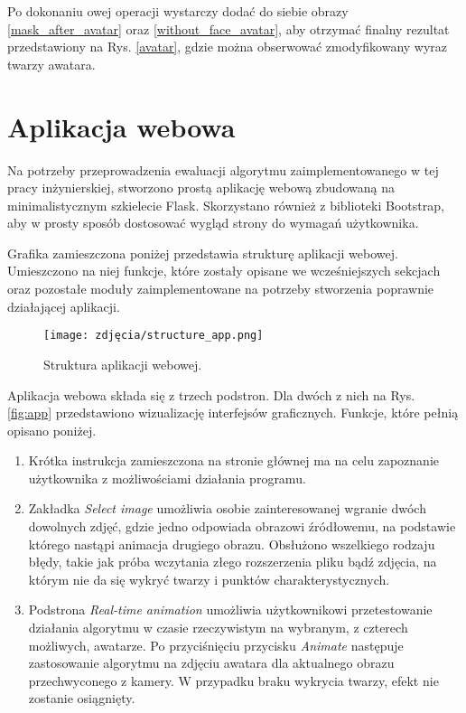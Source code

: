 Po dokonaniu owej operacji wystarczy dodać do siebie obrazy \ref{mask_after_avatar} oraz \ref{without_face_avatar}, aby otrzymać finalny rezultat przedstawiony na Rys. \ref{avatar}, gdzie można obserwować zmodyfikowany wyraz twarzy awatara.



\section{Aplikacja webowa}
Na potrzeby przeprowadzenia ewaluacji algorytmu zaimplementowanego w tej pracy inżynierskiej, stworzono prostą aplikację webową zbudowaną na minimalistycznym szkielecie Flask. Skorzystano również z biblioteki Bootstrap, aby w prosty sposób dostosować wygląd strony do wymagań użytkownika.

Grafika zamieszczona poniżej przedstawia strukturę aplikacji webowej. Umieszczono na niej funkcje, które zostały opisane we wcześniejszych sekcjach oraz pozostałe moduły zaimplementowane na potrzeby stworzenia poprawnie działającej aplikacji.

\begin{figure}[h]
	\centering
	\texttt{[image: zdjęcia/structure\_app.png]}
	\caption{Struktura aplikacji webowej.} 
	\label{fig:structureApp}
\end{figure}

Aplikacja webowa składa się z trzech podstron. Dla dwóch z nich na Rys. \ref{fig:app} przedstawiono wizualizację interfejsów graficznych. Funkcje, które pełnią opisano poniżej.

\begin{enumerate}
    \item Krótka instrukcja zamieszczona na stronie głównej ma na celu zapoznanie użytkownika z możliwościami działania programu.
    \item Zakładka \textit{Select image} umożliwia osobie zainteresowanej wgranie dwóch dowolnych zdjęć, gdzie jedno odpowiada obrazowi źródłowemu, na podstawie którego nastąpi animacja drugiego obrazu. Obsłużono wszelkiego rodzaju błędy, takie jak próba wczytania złego rozszerzenia pliku bądź zdjęcia, na którym nie da się wykryć twarzy i punktów charakterystycznych.
    \item Podstrona \textit{Real-time animation} umożliwia użytkownikowi przetestowanie działania algorytmu w czasie rzeczywistym na wybranym, z czterech możliwych, awatarze. Po przyciśnięciu przycisku \textit{Animate} następuje zastosowanie algorytmu na zdjęciu awatara dla aktualnego obrazu przechwyconego z kamery. W przypadku braku wykrycia twarzy, efekt nie zostanie osiągnięty.
\end{enumerate}

